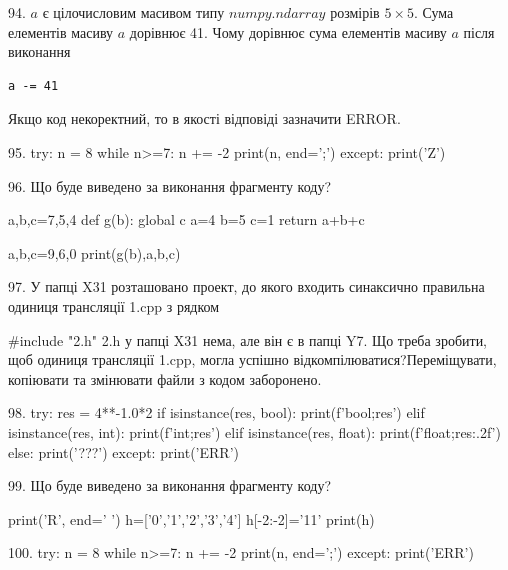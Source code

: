 \documentclass[11pt]{article}
\begin{document}
94. 
$a$ є цілочисловим масивом типу $numpy.ndarray$ розмірів $5{\times}5$. Сума елементів масиву $a$ дорівнює 41. Чому дорівнює сума елементів масиву $a$ після виконання 
\begin{verbatim}
a -= 41
\end{verbatim}


Якщо код некоректний, то в якості відповіді зазначити ERROR.



95. 
try:
    n = 8
    while n>=7:
        n += -2
    print(n, end=';')
except:
    print('Z')

96. Що буде виведено за виконання фрагменту коду?

a,b,c=7,5,4
def g(b):
global c    a=4
    b=5
    c=1
    return a+b+c

a,b,c=9,6,0
print(g(b),a,b,c)

97. 
У папці X31 розташовано проект, до якого входить синаксично правильна одиниця трансляції 1.cpp з рядком\par
{\#}include "2.h"
 2.h у папці X31 нема, але він є в папці Y7. Що треба зробити, щоб одиниця трансляції 1.cpp, могла успішно відкомпілюватися?Переміщувати, копіювати та змінювати файли з кодом заборонено.\par\vspace{1.5cm}
98. 
try:
    res = 4**-1.0*2
    if isinstance(res, bool):
        print(f'bool;{res}')
    elif isinstance(res, int):
        print(f'int;{res}')
    elif isinstance(res, float):
        print(f'float;{res:.2f}')
    else:
        print('???')
except:
    print('ERR')

99. Що буде виведено за виконання фрагменту коду?

print('R', end=' ')
h=['0','1','2','3','4']
h[-2:-2]='11'
print(h)


100. 
try:
    n = 8
    while n>=7:
        n += -2
    print(n, end=';')
except:
    print('ERR')
\end{document}
